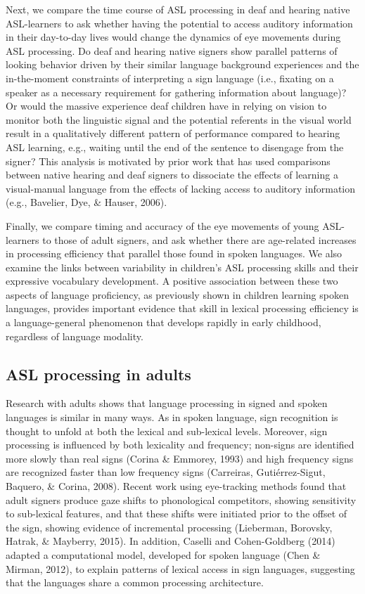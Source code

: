 \documentclass[oneside]{report}
\begin{document}
Next, we compare the time course of ASL processing in deaf and hearing
native ASL-learners to ask whether having the potential to access
auditory information in their day-to-day lives would change the dynamics
of eye movements during ASL processing. Do deaf and hearing native
signers show parallel patterns of looking behavior driven by their
similar language background experiences and the in-the-moment
constraints of interpreting a sign language (i.e., fixating on a speaker
as a necessary requirement for gathering information about language)? Or
would the massive experience deaf children have in relying on vision to
monitor both the linguistic signal and the potential referents in the
visual world result in a qualitatively different pattern of performance
compared to hearing ASL learning, e.g., waiting until the end of the
sentence to disengage from the signer? This analysis is motivated by
prior work that has used comparisons between native hearing and deaf
signers to dissociate the effects of learning a visual-manual language
from the effects of lacking access to auditory information (e.g.,
Bavelier, Dye, \& Hauser, 2006).

Finally, we compare timing and accuracy of the eye movements of young
ASL-learners to those of adult signers, and ask whether there are
age-related increases in processing efficiency that parallel those found
in spoken languages. We also examine the links between variability in
children's ASL processing skills and their expressive vocabulary
development. A positive association between these two aspects of
language proficiency, as previously shown in children learning spoken
languages, provides important evidence that skill in lexical processing
efficiency is a language-general phenomenon that develops rapidly in
early childhood, regardless of language modality.

\hypertarget{asl-processing-in-adults}{%
\subsection{ASL processing in adults}\label{asl-processing-in-adults}}

Research with adults shows that language processing in signed and spoken
languages is similar in many ways. As in spoken language, sign
recognition is thought to unfold at both the lexical and sub-lexical
levels. Moreover, sign processing is influenced by both lexicality and
frequency; non-signs are identified more slowly than real signs (Corina
\& Emmorey, 1993) and high frequency signs are recognized faster than
low frequency signs (Carreiras, Gutiérrez-Sigut, Baquero, \& Corina,
2008). Recent work using eye-tracking methods found that adult signers
produce gaze shifts to phonological competitors, showing sensitivity to
sub-lexical features, and that these shifts were initiated prior to the
offset of the sign, showing evidence of incremental processing
(Lieberman, Borovsky, Hatrak, \& Mayberry, 2015). In addition, Caselli
and Cohen-Goldberg (2014) adapted a computational model, developed for
spoken language (Chen \& Mirman, 2012), to explain patterns of lexical
access in sign languages, suggesting that the languages share a common
processing architecture.
\end{document}
